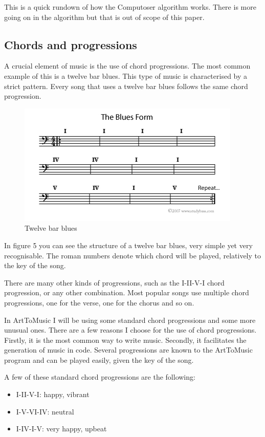 \documentclass[12pt]{article}
\begin{document}
This is a quick rundown of how the Computoser algorithm works. There is more going on in the algorithm but that is out of scope of this paper.
 
\subsection{Chords and progressions}

A crucial element of music is the use of chord progressions. The most common example of this is a twelve bar blues. This type of music is characterised by a strict pattern. Every song that uses a twelve bar blues follows the same chord progression.

\begin{figure}[h]
\centering
\includegraphics[]{img/the-blues-form}
\caption{Twelve bar blues}
\end{figure}

In figure 5 you can see the structure of a twelve bar blues, very simple yet very recognisable. The roman numbers denote which chord will be played, relatively to the key of the song.

There are many other kinds of progressions, such as the I-II-V-I chord progression, or any other combination. Most popular songs use multiple chord progressions, one for the verse, one for the chorus and so on. 
\newline

In ArtToMusic I will be using some standard chord progressions and some more unusual ones. There are a few reasons I choose for the use of chord progressions. Firstly, it is the most common way to write music. Secondly, it facilitates the generation of music in code. Several progressions are known to the ArtToMusic program and can be played easily, given the key of the song. 
‌\newline

A few of these standard chord progressions are the following:
\begin{itemize}
\item I-II-V-I: happy, vibrant
\item I-V-VI-IV: neutral
\item I-IV-I-V: very happy, upbeat
\end{itemize} 
\end{document}
